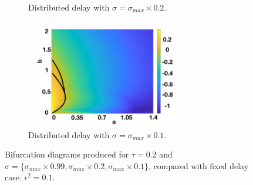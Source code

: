 \begin{figure}[H]
\begin{subfigure}[b]{0.45\textwidth}
        \caption{Distributed delay with $\sigma=\sigma_{max}\times0.2$.}
        \label{}
    \end{subfigure}
    \hfill
    \begin{subfigure}[b]{0.45\textwidth}
        \centering
        \includegraphics[width=7cm,height=4.75cm]{distbif34.png}
        \caption{Distributed delay with $\sigma=\sigma_{max}\times0.1$.}
        \label{}
    \end{subfigure}
    \caption{Bifurcation diagrams produced for $\tau=0.2$ and $\sigma=\{ \sigma_{max}\times0.99,\sigma_{max}\times0.2,\sigma_{max}\times0.1 \}$, compared with fixed delay case. $\epsilon^2=0.1$.}
    \label{fig:distbif3}
\end{figure}
